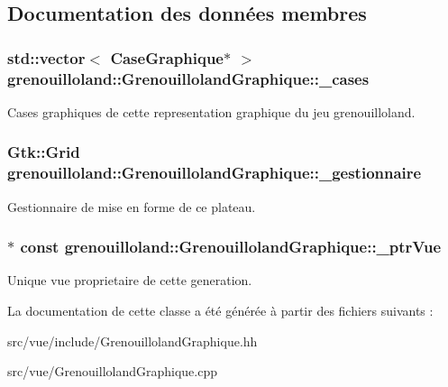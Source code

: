 \subsection{Documentation des données membres}
\hypertarget{classgrenouilloland_1_1GrenouillolandGraphique_ab4d1dbe72f42279511f2ccbd171bbffe}{
\subsubsection[{\-\_\-cases}]{\setlength{\rightskip}{0pt plus 5cm}std\-::vector$<$ {\bf Case\-Graphique}$\ast$ $>$ grenouilloland\-::\-Grenouilloland\-Graphique\-::\-\_\-cases\hspace{0.3cm}{\ttfamily [protected]}}}\label{classgrenouilloland_1_1GrenouillolandGraphique_ab4d1dbe72f42279511f2ccbd171bbffe}
Cases graphiques de cette representation graphique du jeu grenouilloland. \hypertarget{classgrenouilloland_1_1GrenouillolandGraphique_a71036819a9bba19e6ecee48cf7acc00b}{
\subsubsection[{\-\_\-gestionnaire}]{\setlength{\rightskip}{0pt plus 5cm}Gtk\-::\-Grid grenouilloland\-::\-Grenouilloland\-Graphique\-::\-\_\-gestionnaire\hspace{0.3cm}{\ttfamily [protected]}}}\label{classgrenouilloland_1_1GrenouillolandGraphique_a71036819a9bba19e6ecee48cf7acc00b}
Gestionnaire de mise en forme de ce plateau. \hypertarget{classgrenouilloland_1_1GrenouillolandGraphique_aa0fe0c7d9e9cd676b8ce62a40ab97c62}{
\subsubsection[{\-\_\-ptr\-Vue}]{$\ast$ const grenouilloland\-::\-Grenouilloland\-Graphique\-::\-\_\-ptr\-Vue\hspace{0.3cm}{\ttfamily [protected]}}}\label{classgrenouilloland_1_1GrenouillolandGraphique_aa0fe0c7d9e9cd676b8ce62a40ab97c62}
Unique vue proprietaire de cette generation. 

La documentation de cette classe a été générée à partir des fichiers suivants \-:\begin{DoxyCompactItemize}
\item 
src/vue/include/Grenouilloland\-Graphique.\-hh\item 
src/vue/Grenouilloland\-Graphique.\-cpp\end{DoxyCompactItemize}
